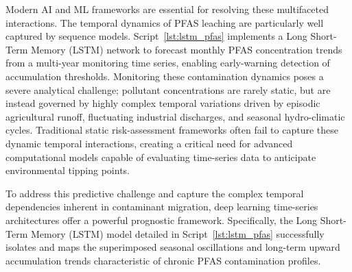 \documentclass[environments,article,submit,pdftex,moreauthors]{Definitions/mdpi}
\begin{document}
Modern AI and ML frameworks
are essential for resolving these multifaceted interactions. The temporal
dynamics of PFAS leaching are particularly well captured by sequence models.
Script~\ref{lst:lstm_pfas} implements a Long Short-Term Memory (LSTM) network
to forecast monthly PFAS concentration trends from a multi-year monitoring
time series, enabling early-warning detection of accumulation thresholds. Monitoring these contamination dynamics poses a severe analytical challenge; pollutant concentrations are rarely static, but are instead governed by highly complex temporal variations driven by episodic agricultural runoff, fluctuating industrial discharges, and seasonal hydro-climatic cycles. Traditional static risk-assessment frameworks often fail to capture these dynamic temporal interactions, creating a critical need for advanced computational models capable of evaluating time-series data to anticipate environmental tipping points.

To address this predictive challenge and capture the complex temporal dependencies inherent in contaminant migration, deep learning time-series architectures offer a powerful prognostic framework. Specifically, the Long Short-Term Memory (LSTM) model detailed in Script~\ref{lst:lstm_pfas} successfully isolates and maps the superimposed seasonal oscillations and long-term upward accumulation trends characteristic of chronic PFAS contamination profiles. 
\end{document}
